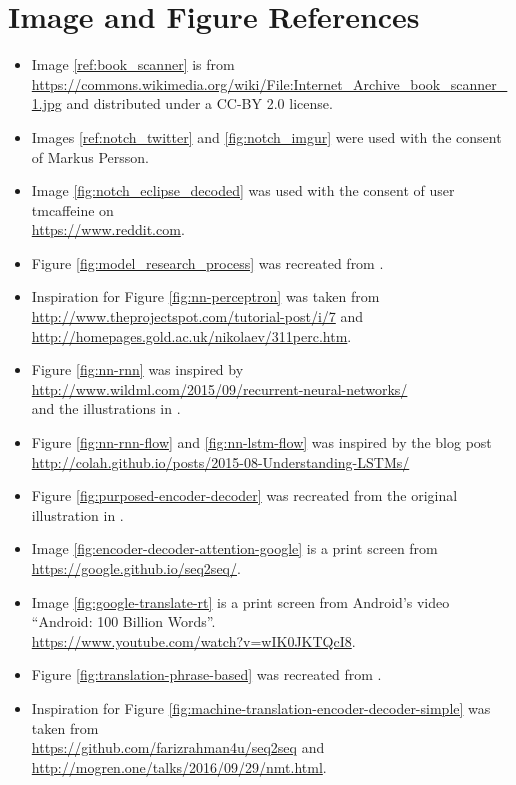 
\chapter{Image and Figure References}

\begin{itemize}
    \item Image \ref{ref:book_scanner} is from \url{https://commons.wikimedia.org/wiki/File:Internet_Archive_book_scanner_1.jpg} and distributed under a CC-BY 2.0 license.
    \item Images \ref{ref:notch_twitter} and \ref{fig:notch_imgur} were used with the consent of Markus Persson.
    \item Image \ref{fig:notch_eclipse_decoded} was used with the consent of user tmcaffeine on \\ \url{https://www.reddit.com}.
    \item Figure \ref{fig:model_research_process} was recreated from \cite{oates2005researching}.
    \item Inspiration for Figure \ref{fig:nn-perceptron} was taken from\\\url{http://www.theprojectspot.com/tutorial-post/i/7} and \\ \url{http://homepages.gold.ac.uk/nikolaev/311perc.htm}.
    \item Figure \ref{fig:nn-rnn} was inspired by \\ \url{http://www.wildml.com/2015/09/recurrent-neural-networks/} \\ and the illustrations in \cite{goodfellow2016deeplearning}.
    \item Figure \ref{fig:nn-rnn-flow} and \ref{fig:nn-lstm-flow} was inspired by the blog post \\ \url{http://colah.github.io/posts/2015-08-Understanding-LSTMs/}
    \item Figure \ref{fig:purposed-encoder-decoder} was recreated from the original illustration in  \cite{cho2014learning}.
    \item Image \ref{fig:encoder-decoder-attention-google} is a print screen from \url{https://google.github.io/seq2seq/}.
    \item Image \ref{fig:google-translate-rt} is a print screen from Android's video ``Android: 100 Billion Words''.\\ \url{https://www.youtube.com/watch?v=wIK0JKTQcI8}.
    \item Figure \ref{fig:translation-phrase-based} was recreated from \cite{koehn2010statistical}.
    \item Inspiration for Figure \ref{fig:machine-translation-encoder-decoder-simple} was taken from \\ \url{https://github.com/farizrahman4u/seq2seq} and\\\url{http://mogren.one/talks/2016/09/29/nmt.html}.
\end{itemize}